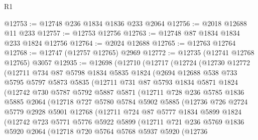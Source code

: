 \begin{lexlean}{R1}
\begin{coremodule}
@12753 := @12748 @236 @1834 @1836 @233 @2064
@12756 := @2018 @12688 @11 @233
@12757 := @12753 @12756
@12763 := @12748 @87 @1834 @1834 @233 @1824 @12756
@12764 := @2024 @12688
@12765 := @12763 @12764
@12768 := @12747 (@12757 @12765) @2969
@12772 := @12735 (@12741 @12768 @12765) @3057
@12935 := @12698
    (@12710
      (@12717
        (@12724
          (@12730
            @12772
            (@12711
              @734
              @87
              @5798
              @1834
              @5835
              @1824
              (@2694
                @12688
                @538
                @733
                @5795
                @5797
                @5873
                @5835
                (@12711
                  @731
                  @87
                  @5793
                  @1834
                  @5871
                  @1824
                  (@12742
                    @730
                    @5787
                    @5792
                    @5887
                    @5871
                    (@12711
                      @728
                      @236
                      @5785
                      @1836
                      @5885
                      @2064
                      (@12718
                        @727
                        @5780
                        @5784
                        @5902
                        @5885
                        (@12736
                          @726
                          @2724
                          @5779
                          @2928
                          @5901
                          @12768
                          (@12711
                            @724
                            @87
                            @5777
                            @1834
                            @5899
                            @1824
                            (@12742
                              @723
                              @5771
                              @5776
                              @5922
                              @5899
                              (@12711
                                @721
                                @236
                                @5769
                                @1836
                                @5920
                                @2064
                                (@12718
                                  @720
                                  @5764
                                  @5768
                                  @5937
                                  @5920
                                  (@12736

\end{coremodule}
\end{lexlean}
